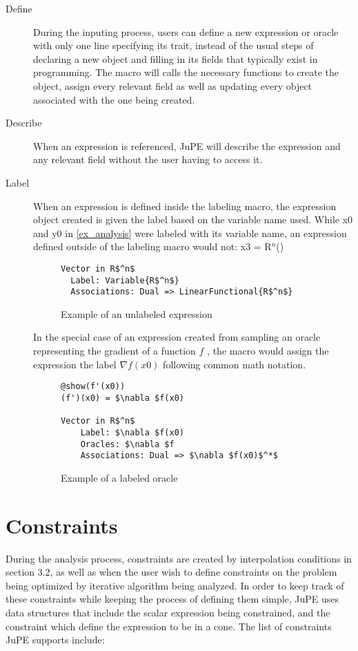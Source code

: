 \begin{description}
	\item[Define] During the inputing process, users can define a new expression or oracle with only one line specifying its trait, instead of the usual steps of declaring a new object and filling in its fields that typically exist in programming. The macro will calls the necessary functions to create the object, assign every relevant field as well as updating every object associated with the one being created.
	\item[Describe] When an expression is referenced, JuPE will describe the expression and any relevant field without the user having to access it.
	\item[Label] When an expression is defined inside the labeling macro, the expression object created is given the label based on the variable name used.	While x0 and y0 in \ref{ex_analysis} were labeled with its variable name, an expression defined outside of the labeling macro would not:
	x3 = R$^n$()
	\begin{figure}[!h]
		\begin{lstlisting}[mathescape]
Vector in R$^n$
  Label: Variable{R$^n$}
  Associations: Dual => LinearFunctional{R$^n$}
\end{lstlisting}
\caption{Example of an unlabeled expression}
\label{ex_unlabeled}
\end{figure}

	In the special case of an expression created from sampling an oracle representing the gradient of a function $f$ , the macro would assign the expression the label $\nabla f(x0)$ following common math notation.
	\begin{figure}[!h]
		\begin{lstlisting}[mathescape]
@show(f'(x0))
(f')(x0) = $\nabla $f(x0)

Vector in R$^n$
	Label: $\nabla $f(x0)
	Oracles: $\nabla $f
	Associations: Dual => $\nabla $f(x0)$^*$
		\end{lstlisting}
		\caption{Example of a labeled oracle}
		\label{ex_labeled}
	\end{figure}
\end{description}

\section{Constraints}
During the analysis process, constraints are created by interpolation conditions in section 3.2, as well as when the user wish to define constraints on the problem being optimized by iterative algorithm being analyzed. In order to keep track of these constraints while keeping the process of defining them simple, JuPE uses data structures that include the scalar expression being constrained, and the constraint which define the expression to be in a cone. The list of constraints JuPE supports include:

